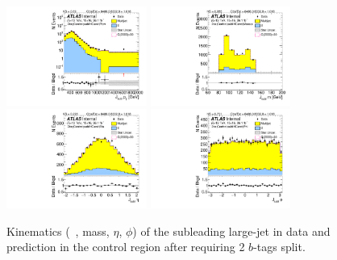 \begin{figure}[htb!]
\begin{center}
\includegraphics[width=0.41\textwidth,angle=-90]{figures/boosted/Control/b77_TwoTag_split_Control_sublHCand_Pt_m_1.pdf}
\includegraphics[width=0.41\textwidth,angle=-90]{figures/boosted/Control/b77_TwoTag_split_Control_sublHCand_Mass_s.pdf}\\
\includegraphics[width=0.41\textwidth,angle=-90]{figures/boosted/Control/b77_TwoTag_split_Control_sublHCand_Eta.pdf}
\includegraphics[width=0.41\textwidth,angle=-90]{figures/boosted/Control/b77_TwoTag_split_Control_sublHCand_Phi.pdf}
  \caption{Kinematics (\pt~, mass, $\eta$, $\phi$) of the subleading large-\R jet in data and prediction in the control region after requiring 2 $b$-tags split. }
  \label{fig:boosted-2bs-control-ak10-subl}
\end{center}
\end{figure}

